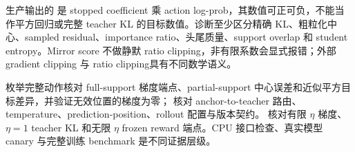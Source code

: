 生产输出的  是 stopped coefficient 乘 action log-prob，其数值可正可负，不能当作平方回归或完整 teacher KL 的目标数值。诊断至少区分精确 KL、粗粒化中心、sampled residual、importance ratio、头尾质量、support overlap 和 student entropy。Mirror score 不做静默 ratio clipping，非有限系数会显式报错；外部 gradient clipping 与 ratio clipping具有不同数学语义。

 枚举完整动作核对 full-support 梯度端点、partial-support 中心误差和近似平方目标差异，并验证无效位置的梯度为零； 核对 anchor-to-teacher 路由、temperature、prediction-position、rollout 配置与版本契约。 核对有限 $\eta$ 梯度、$\eta=1$ teacher KL 和无限 $\eta$ frozen reward 端点。CPU 接口检查、真实模型 canary 与完整训练 benchmark 是不同证据层级。
